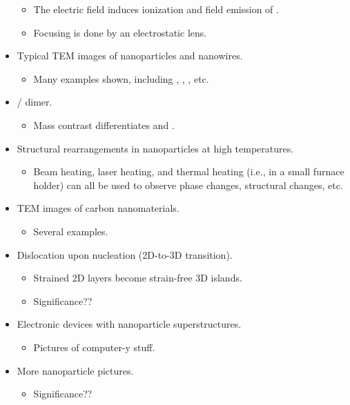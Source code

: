 \documentclass[../notes.tex]{subfiles}
\begin{document}
\begin{itemize}
\begin{itemize}
        \item The electric field induces ionization and field emission of .
        \item Focusing is done by an electrostatic lens.
    \end{itemize}
    \item Typical TEM images of nanoparticles and nanowires.
    \begin{itemize}
        \item Many examples shown, including , , , etc.
    \end{itemize}
    \item {}/ dimer.
    \begin{itemize}
        \item Mass contrast differentiates  and .
    \end{itemize}
    \item Structural rearrangements in  nanoparticles at high temperatures.
    \begin{itemize}
        \item Beam heating, laser heating, and thermal heating (i.e., in a small furnace holder) can all be used to observe phase changes, structural changes, etc.
    \end{itemize}
    \item TEM images of carbon nanomaterials.
    \begin{itemize}
        \item Several examples.
    \end{itemize}
    \item Dislocation upon nucleation (2D-to-3D transition).
    \begin{itemize}
        \item Strained 2D layers become strain-free 3D islands.
        \item Significance??
    \end{itemize}
    \item Electronic devices with nanoparticle superstructures.
    \begin{itemize}
        \item Pictures of computer-y stuff.
    \end{itemize}
    \item More nanoparticle pictures.
    \begin{itemize}
        \item Significance??
    \end{itemize}
\end{itemize}
\end{document}
